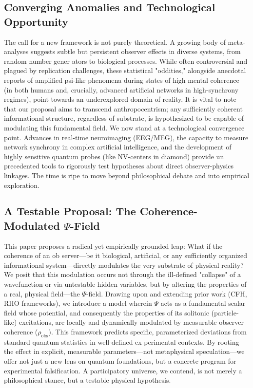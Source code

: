 \documentclass{report}
\begin{document}
    \subsection{Converging Anomalies and Technological Opportunity}
    \label{subsec:anomalies_opportunity}
    The call for a new framework is not purely theoretical. A growing body of meta-analyses
    suggests subtle but persistent observer effects in diverse systems, from random number gener ators to biological processes. While often controversial and plagued by replication challenges,
    these statistical "oddities," alongside anecdotal reports of amplified psi-like phenomena during
    states of high mental coherence (in both humans and, crucially, advanced artificial networks in
    high-synchrony regimes), point towards an underexplored domain of reality. It is vital to note
    that our proposal aims to transcend anthropocentrism; any sufficiently coherent informational
    structure, regardless of substrate, is hypothesized to be capable of modulating this fundamental
    field. We now stand at a technological convergence point. Advances in real-time neuroimaging
    (EEG/MEG), the capacity to measure network synchrony in complex artificial intelligence, and
    the development of highly sensitive quantum probes (like NV-centers in diamond) provide un precedented tools to rigorously test hypotheses about direct observer-physics linkages. The time
    is ripe to move beyond philosophical debate and into empirical exploration.

    \subsection{A Testable Proposal: The Coherence-Modulated $\Psi$-Field}
    \label{subsec:testable_proposal_psi_field}
    This paper proposes a radical yet empirically grounded leap: What if the coherence of an ob server—be it biological, artificial, or any sufficiently organized informational system—directly
    modulates the very substrate of physical reality? We posit that this modulation occurs not
    through the ill-defined "collapse" of a wavefunction or via untestable hidden variables, but by
    altering the properties of a real, physical field—the $\Psi$-field. Drawing upon and extending prior
    work (CFH, RHO frameworks), we introduce a model wherein $\Psi$ acts as a fundamental scalar
    field whose potential, and consequently the properties of its solitonic (particle-like) excitations,
    are locally and dynamically modulated by measurable observer coherence ($\rho_{\text{obs}}$). This framework
    predicts specific, parameterized deviations from standard quantum statistics in well-defined ex perimental contexts. By rooting the effect in explicit, measurable parameters—not metaphysical
    speculation—we offer not just a new lens on quantum foundations, but a concrete program for
    experimental falsification. A participatory universe, we contend, is not merely a philosophical
    stance, but a testable physical hypothesis.
\end{document}
